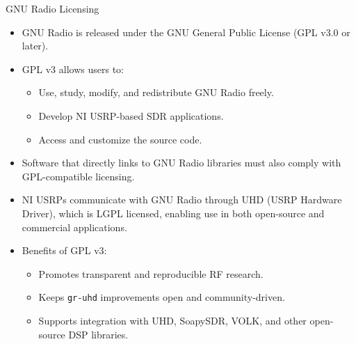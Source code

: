 \begin{frame}{GNU Radio Licensing}
\footnotesize

\begin{itemize}

    \item GNU Radio is released under the GNU General Public License (GPL v3.0 or later).

    \item GPL v3 allows users to:
    \begin{itemize}
        \item Use, study, modify, and redistribute GNU Radio freely.
        \item Develop NI USRP-based SDR applications.
        \item Access and customize the source code.
    \end{itemize}

    \item Software that directly links to GNU Radio libraries must also comply with GPL-compatible licensing.

    \item NI USRPs communicate with GNU Radio through UHD (USRP Hardware Driver), which is LGPL licensed, enabling use in both open-source and commercial applications.

    \item Benefits of GPL v3:
    \begin{itemize}
        \item Promotes transparent and reproducible RF research.
        \item Keeps \texttt{gr-uhd} improvements open and community-driven.
        \item Supports integration with UHD, SoapySDR, VOLK, and other open-source DSP libraries.
    \end{itemize}

\end{itemize}

\end{frame}